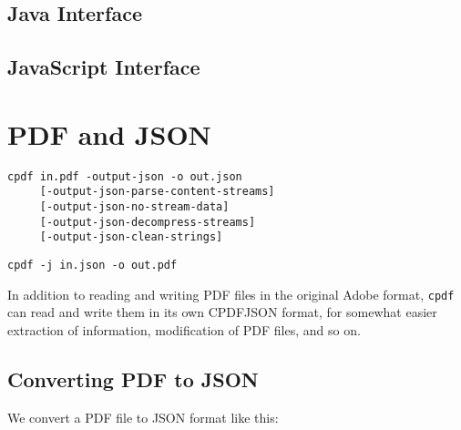 \documentclass{book}
\begin{document}
\begin{jcpdflib}
\clearpage
\section*{Java Interface}
\begin{small}\tt

\end{small}
\end{jcpdflib}

\begin{jscpdflib}
\clearpage
\section*{JavaScript Interface}
\begin{small}\tt

\end{small}
\end{jscpdflib}

\chapter{PDF and JSON}\label{chap:15}\pagestyle{fancy}
  {\small\begin{framed}
  \noindent\verb!cpdf in.pdf -output-json -o out.json!\\
  \noindent\verb!     [-output-json-parse-content-streams]!\\
  \noindent\verb!     [-output-json-no-stream-data]!\\
  \noindent\verb!     [-output-json-decompress-streams]!\\
  \noindent\verb!     [-output-json-clean-strings]!

\vspace{1.5mm}

  \noindent\verb!cpdf -j in.json -o out.pdf!
  \end{framed}}

In addition to reading and writing PDF files in the original Adobe format, \texttt{cpdf} can read and write them in its own CPDFJSON format, for somewhat easier extraction of information, modification of PDF files, and so on.

\section{Converting PDF to JSON}

We convert a PDF file to JSON format like this:
\end{document}
